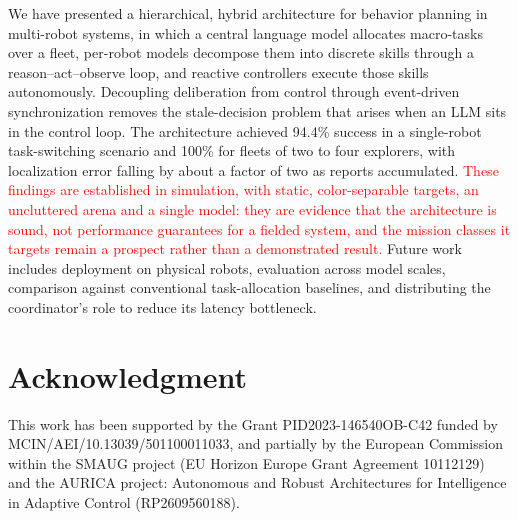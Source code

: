 \documentclass[conference]{IEEEtran}
\newif\ifrevmarks\revmarkstrue
\newcommand{\rev}[1]{\ifrevmarks\textcolor{red}{#1}\else#1\fi}
\begin{document}
We have presented a hierarchical, hybrid architecture for behavior
planning in multi-robot systems, in which a central language model
allocates macro-tasks over a fleet, per-robot models decompose them into
discrete skills through a reason--act--observe loop, and reactive
controllers execute those skills autonomously. Decoupling deliberation
from control through event-driven synchronization removes the
stale-decision problem that arises when an LLM sits in the control loop.
The architecture achieved 94.4\% success in a single-robot task-switching
scenario and 100\% for fleets of two to four explorers, with localization
error falling by about a factor of two as reports accumulated.
\rev{These findings are established in simulation, with static,
color-separable targets, an uncluttered arena and a single model: they
are evidence that the architecture is sound, not performance guarantees
for a fielded system, and the mission classes it targets remain a
prospect rather than a demonstrated result.} Future work includes
deployment on physical robots, evaluation across model scales, comparison
against conventional task-allocation baselines, and distributing the
coordinator's role to reduce its latency bottleneck.

\section*{Acknowledgment}

This work has been supported by the Grant PID2023-146540OB-C42 funded by MCIN/AEI/10.13039/501100011033, and partially by the European Commission within the SMAUG project (EU Horizon Europe Grant Agreement 10112129) and the AURICA project: Autonomous and Robust Architectures for Intelligence in Adaptive Control (RP2609560188).
\end{document}
